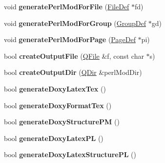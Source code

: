 \begin{DoxyCompactItemize}
void {\bfseries generate\+Perl\+Mod\+For\+File} (\mbox{\hyperlink{class_file_def}{File\+Def}} $\ast$fd)
\item 
\mbox{\label{class_perl_mod_generator_ac7fae8c1ec373e6a654ccecc8364d721}} 
void {\bfseries generate\+Perl\+Mod\+For\+Group} (\mbox{\hyperlink{class_group_def}{Group\+Def}} $\ast$gd)
\item 
\mbox{\label{class_perl_mod_generator_a0151a88e0794af12a9e7932de2d7a928}} 
void {\bfseries generate\+Perl\+Mod\+For\+Page} (\mbox{\hyperlink{class_page_def}{Page\+Def}} $\ast$pi)
\item 
\mbox{\label{class_perl_mod_generator_a94285435e055fe6b0ac52282b6af5c38}} 
bool {\bfseries create\+Output\+File} (\mbox{\hyperlink{class_q_file}{Q\+File}} \&f, const char $\ast$s)
\item 
\mbox{\label{class_perl_mod_generator_ab76a8df150d051532cfc8c3794d95f3f}} 
bool {\bfseries create\+Output\+Dir} (\mbox{\hyperlink{class_q_dir}{Q\+Dir}} \&perl\+Mod\+Dir)
\item 
\mbox{\label{class_perl_mod_generator_a2cb28a6f8bf6b9f155d3929b95acf059}} 
bool {\bfseries generate\+Doxy\+Latex\+Tex} ()
\item 
\mbox{\label{class_perl_mod_generator_a1f0a8822b1895daacce85dd3d93eecac}} 
bool {\bfseries generate\+Doxy\+Format\+Tex} ()
\item 
\mbox{\label{class_perl_mod_generator_a9893c2c270028114dec964284676adc7}} 
bool {\bfseries generate\+Doxy\+Structure\+PM} ()
\item 
\mbox{\label{class_perl_mod_generator_a999b190603bbc840657ad470a17465ad}} 
bool {\bfseries generate\+Doxy\+Latex\+PL} ()
\item 
\mbox{\label{class_perl_mod_generator_ad03aadb67e05b528cd454bed3bee16b9}} 
bool {\bfseries generate\+Doxy\+Latex\+Structure\+PL} ()
\item 
\mbox{\label{class_perl_mod_generator_a72b6d57151d45a13c60402914aa50831}} 

\end{DoxyCompactItemize}
